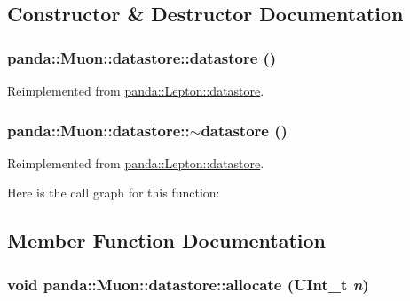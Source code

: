 \subsection{Constructor \& Destructor Documentation}
\hypertarget{structpanda_1_1Muon_1_1datastore_a85904b7d723e3e95abf0901bbf3db103}{
\subsubsection[{datastore}]{\setlength{\rightskip}{0pt plus 5cm}panda::Muon::datastore::datastore ()}}
\label{structpanda_1_1Muon_1_1datastore_a85904b7d723e3e95abf0901bbf3db103}


Reimplemented from \hyperlink{structpanda_1_1Lepton_1_1datastore_adf84bb1f833eb50c3c73d81af211496e}{panda::Lepton::datastore}.\hypertarget{structpanda_1_1Muon_1_1datastore_a399cd7ed5610fc6c99ac1d3365ddc354}{
\subsubsection[{$\sim$datastore}]{\setlength{\rightskip}{0pt plus 5cm}panda::Muon::datastore::$\sim$datastore ()}}
\label{structpanda_1_1Muon_1_1datastore_a399cd7ed5610fc6c99ac1d3365ddc354}


Reimplemented from \hyperlink{structpanda_1_1Lepton_1_1datastore_aded63fdccd7551ae16f99adbd29afb82}{panda::Lepton::datastore}.

Here is the call graph for this function:

\subsection{Member Function Documentation}
\hypertarget{structpanda_1_1Muon_1_1datastore_a6845ee992e7f6f23a4f159b97411bfc6}{
\subsubsection[{allocate}]{\setlength{\rightskip}{0pt plus 5cm}void panda::Muon::datastore::allocate (UInt\_\-t {\em n})}}
\label{structpanda_1_1Muon_1_1datastore_a6845ee992e7f6f23a4f159b97411bfc6}


